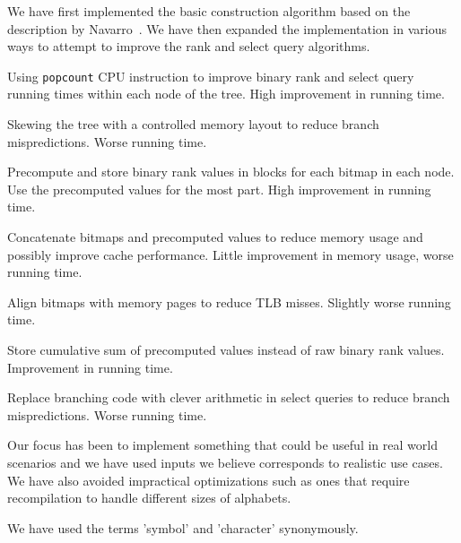 We have first implemented the basic construction algorithm based on the description by Navarro~.
We have then expanded the implementation in various ways to attempt to improve the rank and select query algorithms.
\begin{description*}
\item[Using \texttt{popcount} CPU instruction] to improve binary rank and select query running times within each node of the tree. High improvement in running time.
\item[Skewing the tree] with a controlled memory layout to reduce branch mispredictions. Worse running time.
\item[Precompute and store binary rank values] in blocks for each bitmap in each node. Use the precomputed values for the most part. High improvement in running time.
\item[Concatenate bitmaps and precomputed values] to reduce memory usage and possibly improve cache performance. Little improvement in memory usage, worse running time.
\item[Align bitmaps with memory pages] to reduce TLB misses. Slightly worse running time.
\item[Store cumulative sum of precomputed values] instead of raw binary rank values. Improvement in running time.
\item[Replace branching code with clever arithmetic] in select queries to reduce branch mispredictions. Worse running time.
\end{description*}
Our focus has been to implement something that could be useful in real world scenarios and we have used inputs we believe corresponds to realistic use cases.
We have also avoided impractical optimizations such as ones that require recompilation to handle different sizes of alphabets.

We have used the terms 'symbol' and 'character' synonymously.